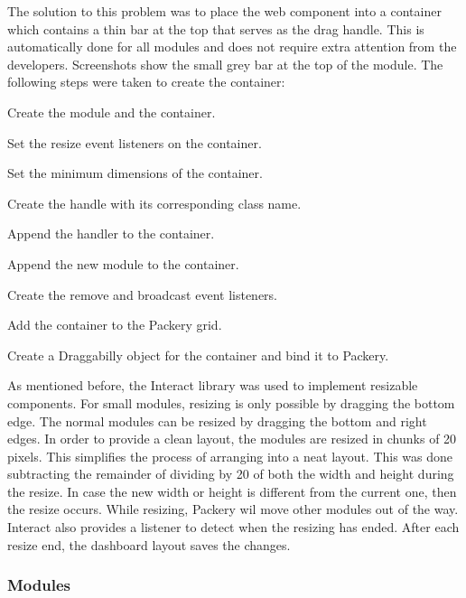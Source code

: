             The solution to this problem was to place the web component into a container which contains a thin bar at the top that serves as the drag handle. This is automatically done for all modules and does not require extra attention from the developers. Screenshots show the small grey bar at the top of the module. The following steps were taken to create the container:
            \vspace{-6pt}
            \begin{myenumerate}
                \item Create the module and the container.
                \item Set the resize event listeners on the container.
                \item Set the minimum dimensions of the container.
                \item Create the handle with its corresponding class name.
                \item Append the handler to the container.
                \item Append the new module to the container.
                \item Create the remove and broadcast event listeners.
                \item Add the container to the Packery grid.
                \item Create a Draggabilly object for the container and bind it to Packery.
            \end{myenumerate}


            As mentioned before, the Interact library was used to implement resizable components. For small modules, resizing is only possible by dragging the bottom edge. The normal modules can be resized by dragging the bottom and right edges. In order to provide a clean layout, the modules are resized in chunks of 20 pixels. This simplifies the process of arranging into a neat layout. This was done subtracting the remainder of dividing by 20 of both the width and height during the resize. In case the new width or height is different from the current one, then the resize occurs. While resizing, Packery wil move other modules out of the way. Interact also provides a listener to detect when the resizing has ended. After each resize end, the dashboard layout saves the changes.

        \subsubsection{Modules}

